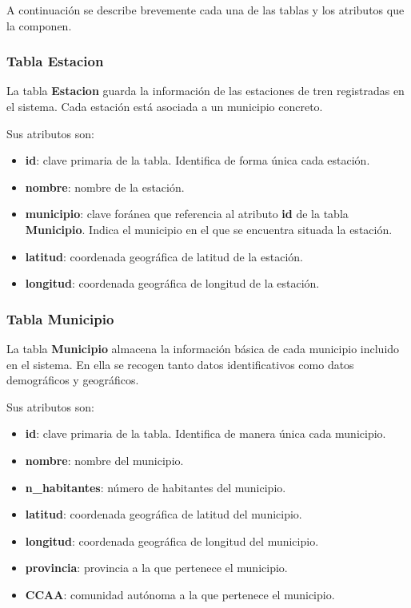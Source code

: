 A continuación se describe brevemente cada una de las tablas y los
atributos que la componen.

\subsubsection{Tabla Estacion}\label{tabla-estacion}

La tabla \textbf{Estacion} guarda la información de las estaciones de
tren registradas en el sistema. Cada estación está asociada a un
municipio concreto.

Sus atributos son:

\begin{itemize}
\tightlist
\item
  \textbf{id}: clave primaria de la tabla. Identifica de forma única
  cada estación.
\item
  \textbf{nombre}: nombre de la estación.
\item
  \textbf{municipio}: clave foránea que referencia al atributo
  \textbf{id} de la tabla \textbf{Municipio}. Indica el municipio en el
  que se encuentra situada la estación.
\item
  \textbf{latitud}: coordenada geográfica de latitud de la estación.
\item
  \textbf{longitud}: coordenada geográfica de longitud de la estación.
\end{itemize}

\subsubsection{Tabla Municipio}\label{tabla-municipio}

La tabla \textbf{Municipio} almacena la información básica de cada
municipio incluido en el sistema. En ella se recogen tanto datos
identificativos como datos demográficos y geográficos.

Sus atributos son:

\begin{itemize}
\tightlist
\item
  \textbf{id}: clave primaria de la tabla. Identifica de manera única
  cada municipio.
\item
  \textbf{nombre}: nombre del municipio.
\item
  \textbf{n\_habitantes}: número de habitantes del municipio.
\item
  \textbf{latitud}: coordenada geográfica de latitud del municipio.
\item
  \textbf{longitud}: coordenada geográfica de longitud del municipio.
\item
  \textbf{provincia}: provincia a la que pertenece el municipio.
\item
  \textbf{CCAA}: comunidad autónoma a la que pertenece el municipio.
\end{itemize}

